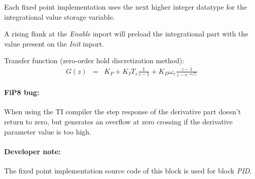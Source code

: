 Each fixed point implementation uses the next higher integer datatype for the integrational value storage variable.

A rising flank at the \textit{Enable} inport will preload the integrational part with the value present on the \textit{Init} inport.
\newline

\noindent
Transfer function (zero-order hold discretization method):
\begin{eqnarray*}
	G(z) &=& K_{P} + K_{I}T_{s}\frac{1}{z-1} + K_{D}\omega_{c}\frac{z-1}{z-e^{-\omega_{c}T_{s}}}
\end{eqnarray*}

\paragraph{FiP8 bug:} When using the TI compiler the step response of the derivative part doesn't return to zero, but generates an overflow at zero crossing if the derivative parameter value is too high.
\paragraph{Developer note:} The fixed point implementation source code of this block is used for block \textit{PID}.
